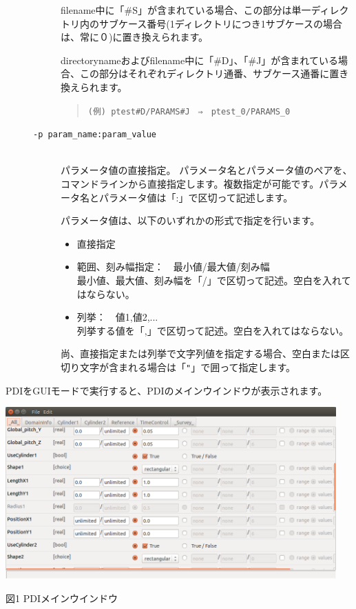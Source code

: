 \documentclass[a4paper,11pt]{jarticle}
\begin{document}
\begin{description}
\begin{description}
filename中に「\#S」が含まれている場合、この部分は単一ディレクトリ内のサブケース番号(1ディレクトリにつき1サブケースの場合は、常に０)に置き換えられます。

directorynameおよびfilename中に「\#D」、「\#J」が含まれている場合、この部分はそれぞれディレクトリ通番、サブケース通番に置き換えられます。
\begin{quote}
{\tt (例) ptest\#D/PARAMS\#J　⇒　ptest\_0/PARAMS\_0}
\end{quote}

\item[{\tt -p param\_name:param\_value}] {\ }\\
パラメータ値の直接指定。
パラメータ名とパラメータ値のペアを、コマンドラインから直接指定します。複数指定が可能です。パラメータ名とパラメータ値は「:」で区切って記述します。

パラメータ値は、以下のいずれかの形式で指定を行います。
\begin{itemize}
\item 直接指定
\item 範囲、刻み幅指定：　最小値/最大値/刻み幅\\
最小値、最大値、刻み幅を「/」で区切って記述。空白を入れてはならない。
\item 列挙：　値1,値2,...\\
列挙する値を「,」で区切って記述。空白を入れてはならない。
\end{itemize}

尚、直接指定または列挙で文字列値を指定する場合、空白または区切り文字が含まれる場合は「{\tt "}」で囲って指定します。

\end{description}
\end{description}

PDIをGUIモードで実行すると、PDIのメインウインドウが表示されます。

\begin{center}
\includegraphics[width=360pt, bb=0 0 980 508]{figs/fig001.png}

図1 PDIメインウインドウ
\end{center}
\end{document}
